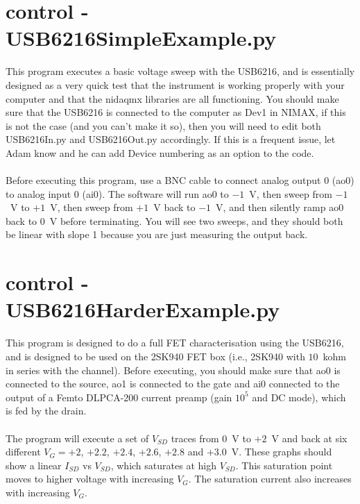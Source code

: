 \section{control - USB6216SimpleExample.py}
This program executes a basic voltage sweep with the USB6216, and is essentially designed as a very quick test that the instrument is working properly with your computer and that the nidaqmx libraries are all functioning. You should make sure that the USB6216 is connected to the computer as Dev1 in NIMAX, if this is not the case (and you can't make it so), then you will need to edit both USB6216In.py and USB6216Out.py accordingly. If this is a frequent issue, let Adam know and he can add Device numbering as an option to the code.\\
\\
Before executing this program, use a BNC cable to connect analog output 0 (ao0) to analog input 0 (ai0). The software will run ao0 to $-1$~V, then sweep from $-1$~V to $+1$~V, then sweep from $+1$~V back to $-1$~V, and then silently ramp ao0 back to $0$~V before terminating. You will see two sweeps, and they should both be linear with slope 1 because you are just measuring the output back.\\
\section{control - USB6216HarderExample.py}
This program is designed to do a full FET characterisation using the USB6216, and is designed to be used on the 2SK940 FET box (i.e., 2SK940 with $10$~kohm in series with the channel). Before executing, you should make sure that ao0 is connected to the source, ao1 is connected to the gate and ai0 connected to the output of a Femto DLPCA-200 current preamp (gain $10^{5}$ and DC mode), which is fed by the drain.\\
\\
The program will execute a set of $V_{SD}$ traces from $0$~V to $+2$~V and back at six different $V_{G} = +2$, $+2.2$, $+2.4$, $+2.6$, $+2.8$ and $+3.0$~V. These graphs should show a linear $I_{SD}$ vs $V_{SD}$, which saturates at high $V_{SD}$. This saturation point moves to higher voltage with increasing $V_{G}$. The saturation current also increases with increasing $V_{G}$.\\

 